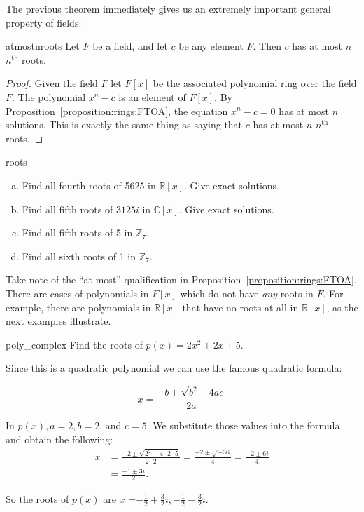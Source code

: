 The previous theorem immediately gives us an extremely important general property of fields:

\begin{prop}{atmostnroots}
Let $F$ be a field, and let $c$ be any element $F$.  Then $c$ has at most $n$ $n^{\text{th}}$ roots.
\end {prop}


\begin{proof}
Given the field $F$ let $F[x]$ be the associated polynomial ring over the field $F$. The polynomial $x^n-c$ is an element of $F[x]$. By Proposition~\ref{proposition:rings:FTOA}, the equation $x^n-c=0$ has at most $n$ solutions.  This is exactly the same thing as saying that $c$ has at most $n$ $n^{\text{th}}$ roots.
\end {proof}

\begin{exercise}{roots}
\begin {enumerate}[(a)]
\item
Find all fourth roots of 5625 in $\mathbb{R}[x]$. Give exact solutions.
\item
Find all fifth roots of $3125i$ in $\mathbb{C}[x]$. Give exact solutions. 
\item
Find all fifth roots of 5 in $\mathbb{Z}_7$.
\item
Find all sixth roots of 1 in $\mathbb{Z}_7$.
\end{enumerate}
\end{exercise}


Take note of the ``at most'' qualification in Proposition~\ref{proposition:rings:FTOA}. There are cases of polynomials in $F[x]$ which do not have  \emph{any} roots in $F$. For example, there are polynomials in $\mathbb{R}[x]$ that have no roots at all in $\mathbb{R}[x]$, as the next examples illustrate.

\begin{example}{poly_complex} 
Find the roots of $p(x)=2x^2+2x+5$.

Since this is a quadratic polynomial we can use the famous quadratic formula:

$$x=\frac {-b \pm \sqrt{b^2-4ac}}{2a}$$

In $p(x), a=2, b=2$, and $c=5.$ We substitute those values into the formula and obtain the following:
\begin{align*}
x&=\frac {-2 \pm \sqrt{2^2-4\cdot 2\cdot 5}}{2\cdot 2}=\frac {-2 \pm \sqrt{-36}}{4}=\frac {-2 \pm 6i}{4}\\
&=\frac {-1 \pm 3i}{2}.
\end{align*}

So the roots of $p(x)$ are $x$ ={$-\frac{1}{2}+\frac{3}{2}i, -\frac{1}{2}-\frac{3}{2}i$}.
\end{example}

